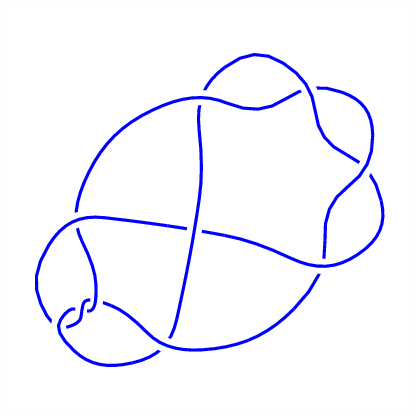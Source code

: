\begin{figure}[H]
\begin{minipage}[b]{.18\linewidth}
	\end{minipage}
	\begin{minipage}[b]{.18\linewidth}
		\centering
		\includegraphics[width=\linewidth]{../data/10_16.png}
	\end{minipage}
\end{figure}

